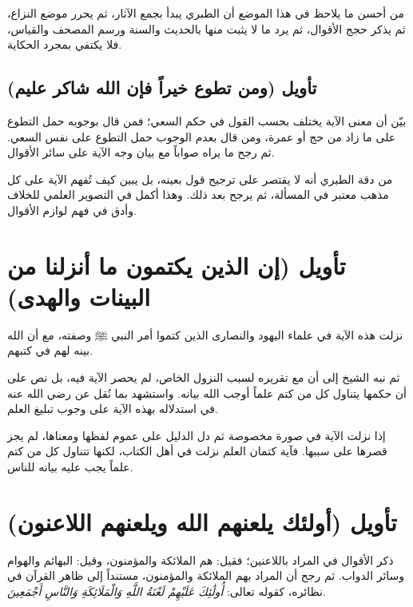 \begin{fawaid}
من أحسن ما يلاحظ في هذا الموضع أن الطبري يبدأ بجمع الآثار، ثم يحرر موضع النزاع، ثم يذكر حجج الأقوال، ثم يرد ما لا يثبت منها بالحديث والسنة ورسم المصحف والقياس، فلا يكتفي بمجرد الحكاية.
\end{fawaid}

\subsection{تأويل (ومن تطوع خيراً فإن الله شاكر عليم)}
بيّن  أن معنى الآية يختلف بحسب القول في حكم السعي؛ فمن قال بوجوبه حمل التطوع على ما زاد من حج أو عمرة، ومن قال بعدم الوجوب حمل التطوع على نفس السعي. ثم رجح ما يراه صواباً مع بيان وجه الآية على سائر الأقوال.

\begin{fawaid}
من دقة الطبري أنه لا يقتصر على ترجيح قول بعينه، بل يبين كيف تُفهم الآية على كل مذهب معتبر في المسألة، ثم يرجح بعد ذلك. وهذا أكمل في التصوير العلمي للخلاف وأدق في فهم لوازم الأقوال.
\end{fawaid}

\separator

\section{تأويل (إن الذين يكتمون ما أنزلنا من البينات والهدى)}
 نزلت هذه الآية في علماء اليهود والنصارى الذين كتموا أمر النبي ﷺ وصفته، مع أن الله بينه لهم في كتبهم.

ثم نبه الشيخ إلى أن  مع تقريره لسبب النزول الخاص، لم يحصر الآية فيه، بل نص على أن حكمها يتناول كل من كتم علماً أوجب الله بيانه. واستشهد بما نُقل عن  رضي الله عنه في استدلاله بهذه الآية على وجوب تبليغ العلم.

\begin{fawaid}
إذا نزلت الآية في صورة مخصوصة ثم دل الدليل على عموم لفظها ومعناها، لم يجز قصرها على سببها. فآية كتمان العلم نزلت في أهل الكتاب، لكنها تتناول كل من كتم علماً يجب عليه بيانه للناس.
\end{fawaid}

\separator

\section{تأويل (أولئك يلعنهم الله ويلعنهم اللاعنون)}
ذكر  الأقوال في المراد باللاعنين؛ فقيل: هم الملائكة والمؤمنون، وقيل: البهائم والهوام وسائر الدواب. ثم رجح أن المراد بهم الملائكة والمؤمنون، مستنداً إلى ظاهر القرآن في نظائره، كقوله تعالى: \textit{أُولَٰئِكَ عَلَيْهِمْ لَعْنَةُ اللَّهِ وَالْمَلَائِكَةِ وَالنَّاسِ أَجْمَعِينَ}.

